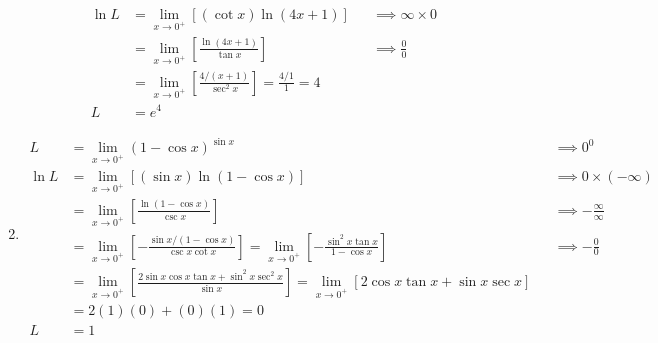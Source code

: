\documentclass[12pt, A4]{report}
\begin{document}
\begin{enumerate}
\begin{align*}
						\ln L &= \lim_{x\to 0^+}[(\cot x)\ln(4x + 1)]
								&&\implies \infty \times 0 \\
							&= \lim_{x\to 0^+}\left[\frac{\ln(4x + 1)}{\tan x}\right]
								&&\implies \frac{0}{0} \\
							&= \lim_{x\to 0^+}\left[\frac{4/(x + 1)}{\sec^2 x}\right] 
								= \frac{4/1}{1} 
								= 4 \\
						L &= e^4
					\end{align*}
				\item
					\begin{align*}
						L &= \lim_{x\to 0^+}(1 - \cos x)^{\sin x}
								&&\implies 0^0 \\
						\ln L &= \lim_{x\to 0^+}\left[(\sin x)\ln(1 - \cos x)\right]
								&&\implies 0 \times (-\infty) \\
							&= \lim_{x\to 0^+}\left[\frac{\ln(1 - \cos x)}{\csc x}\right]
								&&\implies -\frac{\infty}{\infty} \\
							&= \lim_{x\to 0^+}\left[-\frac{\sin x /(1 - \cos x)}{\csc x \cot x}\right]
								= \lim_{x\to 0^+}\left[-\frac{\sin^2x\tan x}{1 - \cos x}\right]
								&&\implies -\frac{0}{0} \\
							&= \lim_{x\to 0^+}\left[\frac{2\sin x \cos x \tan x + \sin^2 x \sec^2 x}{\sin x}\right]
								= \lim_{x\to 0^+}[2\cos x \tan x + \sin x \sec x] \\
							&= 2(1)(0) + (0)(1) = 0 \\
						L &= 1
					\end{align*}
			\end{enumerate}
\end{document}
